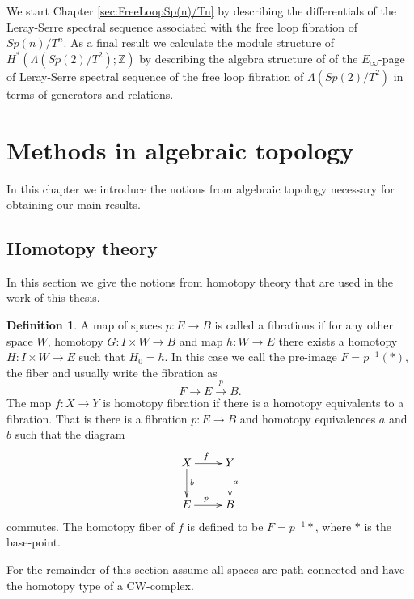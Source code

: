 \documentclass{article}
\theoremstyle{plain}
\theoremstyle{definition}
\newtheorem{defn}[thm]{Definition}
\numberwithin{thm}{section}
\begin{document}
			We start Chapter \ref{sec:FreeLoopSp(n)/Tn} by describing the differentials of
			the Leray-Serre spectral sequence associated with the free loop fibration of $Sp(n)/T^n$.
			As a final result we calculate the module structure of $H^*(\Lambda(Sp(2)/T^2);\mathbb{Z})$ by describing the algebra structure of
		  of the $E_\infty$-page of Leray-Serre spectral sequence of the free loop fibration of $\Lambda(Sp(2)/T^2)$ in terms of generators and relations.

\newpage
\section{Methods in algebraic topology}\label{sec:topology}

	In this chapter we introduce the notions from algebraic topology necessary for obtaining our main results.

	\subsection{Homotopy theory}\label{sec:homotopy}
		
		In this section we give the notions from homotopy theory that are used in the work of this thesis.
		
		\begin{defn}\label{def:fibration}
			A map of spaces $p \colon E \to B$ is called a fibrations if for any other space $W$, homotopy $G \colon I\times W \to B$ and map $h \colon W \to E$
			there exists a homotopy $H \colon I\times W \to E$ such that $H_0=h$. 
			In this case we call the pre-image $F=p^{-1}(*)$, the fiber and usually write the fibration as
			\begin{equation*}
				F\to E \xrightarrow{p} B.
			\end{equation*}
			The map $f \colon X \to Y$ is homotopy fibration if there is a homotopy equivalents to a fibration.
			That is there is a fibration  $p \colon E \to B$ and homotopy equivalences $a$ and $b$ such that the diagram
			\begin{equation*}
						\xymatrix{
						{X}\ar[r]^(0.45){f}\ar[d]^(0.45){b} & {Y}\ar[d]^(0.45){a} \\
						{E}\ar[r]^(0.45){p} & {B} 
						}
			\end{equation*}
			commutes.
			The homotopy fiber of $f$ is defined to be $F=p^{-1}{*}$, where $*$ is the base-point.
		\end{defn}
		
		For the remainder of this section assume all spaces are path connected and have the homotopy type of a CW-complex.
		
\end{document}
